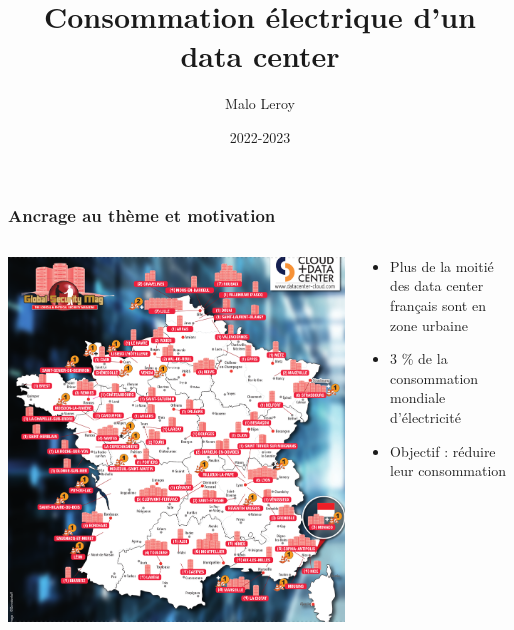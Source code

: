 \documentclass[a4paper,11pt]{beamer}
\title{Consommation électrique d'un data center}
\author{Malo Leroy}
\institute{Candidat n° 21802}
\date{2022-2023}
\begin{document}

\maketitle %


\begin{frame}
    \frametitle{Ancrage au thème et motivation}

    \begin{columns}
        \begin{column}{0.5\textwidth}
            \includegraphics[width=\textwidth]{carte_data_center.png}
        \end{column}
        \begin{column}{0.5\textwidth}
            \begin{itemize}
                \item Plus de la moitié des data center français sont en zone urbaine
                \item 3 \% de la consommation mondiale d'électricité
                \item Objectif : réduire leur consommation
            \end{itemize}
        \end{column}
    \end{columns}
\end{frame}
\end{document}
